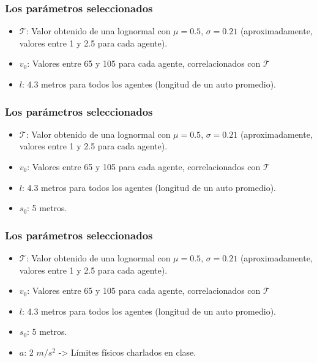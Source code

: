 \documentclass[10pt, compress]{beamer}
\begin{document}
\begin{frame}[fragile]

\frametitle{Los par\'ametros seleccionados}

\begin{itemize}

\item $\mathcal{T}$: Valor obtenido de una lognormal con $\mu = 0.5$, $\sigma = 0.21$ (aproximadamente, valores entre 1 y 2.5 para cada agente).
\item $v_0$: Valores entre 65 y 105 para cada agente, correlacionados con $\mathcal{T}$
\item $l$: 4.3 metros para todos los agentes (longitud de un auto promedio).

\end{itemize}

\end{frame}

\begin{frame}[fragile]

\frametitle{Los par\'ametros seleccionados}

\begin{itemize}

\item $\mathcal{T}$: Valor obtenido de una lognormal con $\mu = 0.5$, $\sigma = 0.21$ (aproximadamente, valores entre 1 y 2.5 para cada agente).
\item $v_0$: Valores entre 65 y 105 para cada agente, correlacionados con $\mathcal{T}$
\item $l$: 4.3 metros para todos los agentes (longitud de un auto promedio).
\item $s_0$: 5 metros.

\end{itemize}

\end{frame}

\begin{frame}[fragile]
\frametitle{Los par\'ametros seleccionados}

\begin{itemize}

\item $\mathcal{T}$: Valor obtenido de una lognormal con $\mu = 0.5$, $\sigma = 0.21$ (aproximadamente, valores entre 1 y 2.5 para cada agente).
\item $v_0$: Valores entre 65 y 105 para cada agente, correlacionados con $\mathcal{T}$
\item $l$: 4.3 metros para todos los agentes (longitud de un auto promedio).
\item $s_0$: 5 metros.
\item $a$: 2 $m/s^2$ -> Límites físicos charlados en clase.

\end{itemize}

\end{frame}
\end{document}
